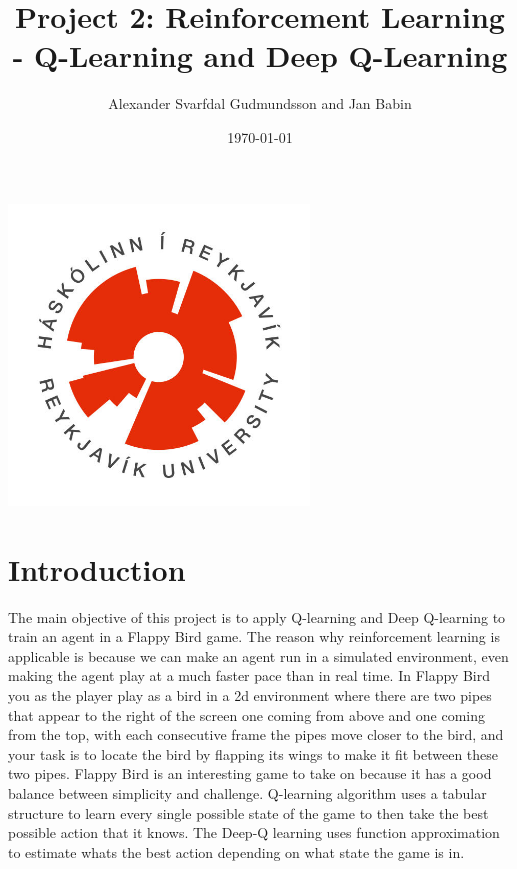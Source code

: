 \documentclass[a4paper,12pt]{article}
\title{Project 2: Reinforcement Learning - Q-Learning and Deep Q-Learning}
\author{Alexander Svarfdal Gudmundsson and Jan Babin}
\date{\today}
\begin{document}
\maketitle

\begin{center}  
    \includegraphics[width=0.6\textwidth]{HR_logo.jpg}
\end{center}

\clearpage

\tableofcontents

\clearpage

\section{Introduction}
The main objective of this project is to apply Q-learning and Deep Q-learning to train an agent in a Flappy Bird game. 
The reason why reinforcement learning is applicable is because we can make an agent run in a simulated environment, 
even making the agent play at a much faster pace than in real time. 
In Flappy Bird you as the player play as a bird in a 2d environment where there are two pipes that appear to the right of the screen one coming from above and one coming from the top, 
with each consecutive frame the pipes move closer to the bird, and your task is to locate the bird by flapping its wings to make it fit between these two pipes. 
Flappy Bird is an interesting game to take on because it has a good balance between simplicity and challenge. 
Q-learning algorithm uses a tabular structure to learn every single possible state of the game to then take the best possible action that it knows. 
The Deep-Q learning uses function approximation to estimate whats the best action depending on what state the game is in. 
\end{document}
